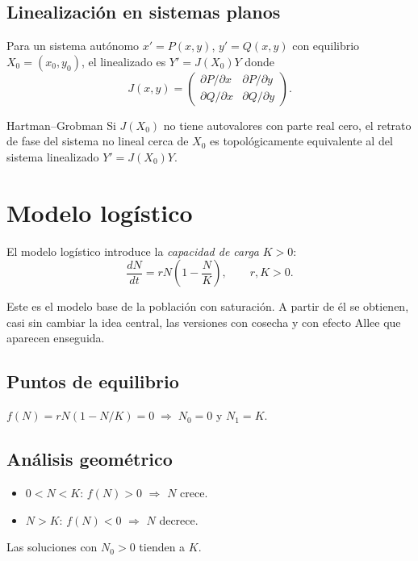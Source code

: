 \documentclass[11pt,letterpaper]{article}
\begin{document}
\subsection{Linealización en sistemas planos}

Para un sistema autónomo $x'=P(x,y)$, $y'=Q(x,y)$ con equilibrio $X_0=(x_0,y_0)$,
el linealizado es $Y'=J(X_0)Y$ donde
\[
J(x,y)=\begin{pmatrix}
\partial P/\partial x & \partial P/\partial y\\
\partial Q/\partial x & \partial Q/\partial y
\end{pmatrix}.
\]

\begin{teorema}{Hartman--Grobman}{}
Si $J(X_0)$ no tiene autovalores con parte real cero, el retrato de fase
del sistema no lineal cerca de $X_0$ es topológicamente equivalente al
del sistema linealizado $Y'=J(X_0)Y$.
\end{teorema}

\section{Modelo logístico}
\label{sec:modelo-logistico}

El modelo logístico introduce la \emph{capacidad de carga} $K>0$:
\[
\boxed{\frac{dN}{dt}=rN\!\left(1-\frac{N}{K}\right),\qquad r,K>0.}
\]

Este es el modelo base de la población con saturación. A partir de él se
obtienen, casi sin cambiar la idea central, las versiones con cosecha y con
efecto Allee que aparecen enseguida.

\subsection{Puntos de equilibrio}

$f(N)=rN(1-N/K)=0\;\Rightarrow\;N_0=0$ y $N_1=K$.

\subsection{Análisis geométrico}

\begin{itemize}
    \item $0<N<K$: $f(N)>0$ $\Rightarrow$ $N$ crece.
    \item $N>K$: $f(N)<0$ $\Rightarrow$ $N$ decrece.
\end{itemize}
Las soluciones con $N_0>0$ tienden a $K$.
\end{document}
